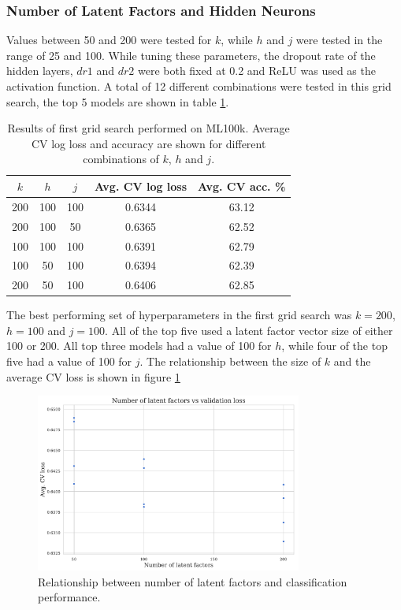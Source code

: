 \subsubsection{Number of Latent Factors and Hidden Neurons}
Values between 50 and 200 were tested for $k$, while $h$ and $j$ were tested in the range of 25 and 100. While tuning these parameters, the dropout rate of the hidden layers, $dr1$ and $dr2$ were both fixed at 0.2 and ReLU was used as the activation function. A total of 12 different combinations were tested in this grid search, the top 5 models are shown in table \ref{tab:ml100k-grid-results1}.

\begin{table}[H]
\centering
\begin{tabular}{c | c | c | c | c}
\toprule
\textbf{$k$} & \textbf{$h$} & \textbf{$j$} & \textbf{Avg. CV log loss} & \textbf{Avg. CV acc.} \% \\
\midrule
200 & 100 & 100 & 0.6344 & 63.12 \\
\midrule
200 & 100 & 50 & 0.6365 & 62.52 \\
\midrule
100 & 100 & 100 & 0.6391 & 62.79 \\
\midrule
100 & 50 & 100 & 0.6394 & 62.39 \\
\midrule
200 & 50 & 100 & 0.6406 & 62.85 \\
\bottomrule
\end{tabular}
\caption[MovieLens 100k grid search results -- number of nodes]{Results of first grid search performed on ML100k. Average CV log loss and accuracy are shown for different combinations of $k$, $h$ and $j$.}
\label{tab:ml100k-grid-results1}
\end{table}

The best performing set of hyperparameters in the first grid search was $k=200$, $h=100$ and $j=100$. All of the top five used a latent factor vector size of either 100 or 200. All top three models had a value of 100 for $h$, while four of the top five had a value of 100 for $j$. The relationship between the size of $k$ and the average CV loss is shown in figure \ref{fig:5-latent-size}

\begin{figure}[H]
\centering
\includegraphics[width=0.78\textwidth]{Figures/5_ml100k-latent-factors.pdf}
\decoRule
\caption[Number of latent factors vs classification accuracy]{Relationship between number of latent factors and classification performance.}
\label{fig:5-latent-size}
\end{figure}

